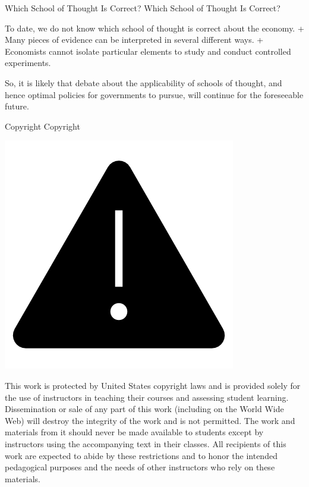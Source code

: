 \documentclass[
  12pt,
  ignorenonframetext,
]{beamer}
\begin{document}
\begin{frame}{Which School of Thought Is Correct?}
\protect\hypertarget{which-school-of-thought-is-correct}{}
Which School of Thought Is Correct?

To date, we do not know which school of thought is correct about the
economy. + Many pieces of evidence can be interpreted in several
different ways. + Economists cannot isolate particular elements to study
and conduct controlled experiments.

So, it is likely that debate about the applicability of schools of
thought, and hence optimal policies for governments to pursue, will
continue for the foreseeable future.
\end{frame}

\begin{frame}{Copyright}
\protect\hypertarget{copyright}{}
Copyright

\includegraphics[width=\textwidth,height=0.99\textheight]{imgs3/img_slide59a.png}

This work is protected by United States copyright laws and is provided
solely for the use of instructors in teaching their courses and
assessing student learning. Dissemination or sale of any part of this
work (including on the World Wide Web) will destroy the integrity of the
work and is not permitted. The work and materials from it should never
be made available to students except by instructors using the
accompanying text in their classes. All recipients of this work are
expected to abide by these restrictions and to honor the intended
pedagogical purposes and the needs of other instructors who rely on
these materials.
\end{frame}
\end{document}
